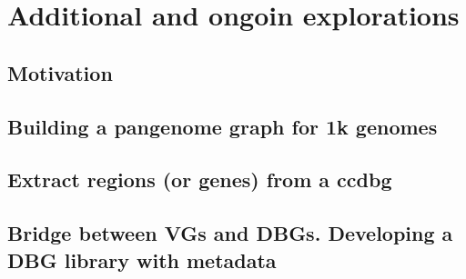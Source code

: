 \chapter{Additional and ongoin explorations}
\label{sec:explorations}

\section{Motivation}

\section{Building a pangenome graph for 1k genomes}

\section{Extract regions (or genes) from a ccdbg}

\section{Bridge between VGs and DBGs. Developing a DBG library with metadata}